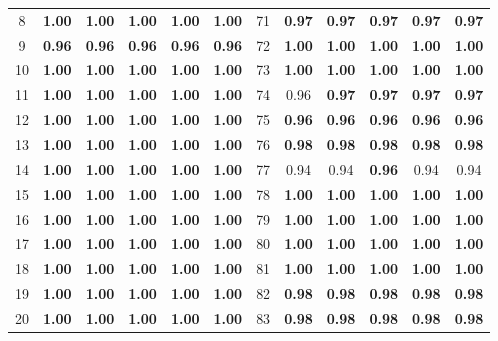 \documentclass{article}
\begin{document}
{\begin{longtable}{cccccc@{\qquad}cccccc}
8 & \textbf{1.00} & \textbf{1.00} & \textbf{1.00} & \textbf{1.00} & \textbf{1.00} & 71 & \textbf{0.97} & \textbf{0.97} & \textbf{0.97} & \textbf{0.97} & \textbf{0.97} \\
9 & \textbf{0.96} & \textbf{0.96} & \textbf{0.96} & \textbf{0.96} & \textbf{0.96} & 72 & \textbf{1.00} & \textbf{1.00} & \textbf{1.00} & \textbf{1.00} & \textbf{1.00} \\
10 & \textbf{1.00} & \textbf{1.00} & \textbf{1.00} & \textbf{1.00} & \textbf{1.00} & 73 & \textbf{1.00} & \textbf{1.00} & \textbf{1.00} & \textbf{1.00} & \textbf{1.00} \\
11 & \textbf{1.00} & \textbf{1.00} & \textbf{1.00} & \textbf{1.00} & \textbf{1.00} & 74 & 0.96 & \textbf{0.97} & \textbf{0.97} & \textbf{0.97} & \textbf{0.97} \\
12 & \textbf{1.00} & \textbf{1.00} & \textbf{1.00} & \textbf{1.00} & \textbf{1.00} & 75 & \textbf{0.96} & \textbf{0.96} & \textbf{0.96} & \textbf{0.96} & \textbf{0.96} \\
13 & \textbf{1.00} & \textbf{1.00} & \textbf{1.00} & \textbf{1.00} & \textbf{1.00} & 76 & \textbf{0.98} & \textbf{0.98} & \textbf{0.98} & \textbf{0.98} & \textbf{0.98} \\
14 & \textbf{1.00} & \textbf{1.00} & \textbf{1.00} & \textbf{1.00} & \textbf{1.00} & 77 & 0.94 & 0.94 & \textbf{0.96} & 0.94 & 0.94 \\
15 & \textbf{1.00} & \textbf{1.00} & \textbf{1.00} & \textbf{1.00} & \textbf{1.00} & 78 & \textbf{1.00} & \textbf{1.00} & \textbf{1.00} & \textbf{1.00} & \textbf{1.00} \\
16 & \textbf{1.00} & \textbf{1.00} & \textbf{1.00} & \textbf{1.00} & \textbf{1.00} & 79 & \textbf{1.00} & \textbf{1.00} & \textbf{1.00} & \textbf{1.00} & \textbf{1.00} \\
17 & \textbf{1.00} & \textbf{1.00} & \textbf{1.00} & \textbf{1.00} & \textbf{1.00} & 80 & \textbf{1.00} & \textbf{1.00} & \textbf{1.00} & \textbf{1.00} & \textbf{1.00} \\
18 & \textbf{1.00} & \textbf{1.00} & \textbf{1.00} & \textbf{1.00} & \textbf{1.00} & 81 & \textbf{1.00} & \textbf{1.00} & \textbf{1.00} & \textbf{1.00} & \textbf{1.00} \\
19 & \textbf{1.00} & \textbf{1.00} & \textbf{1.00} & \textbf{1.00} & \textbf{1.00} & 82 & \textbf{0.98} & \textbf{0.98} & \textbf{0.98} & \textbf{0.98} & \textbf{0.98} \\
20 & \textbf{1.00} & \textbf{1.00} & \textbf{1.00} & \textbf{1.00} & \textbf{1.00} & 83 & \textbf{0.98} & \textbf{0.98} & \textbf{0.98} & \textbf{0.98} & \textbf{0.98} \\

\end{longtable}}
\end{document}
